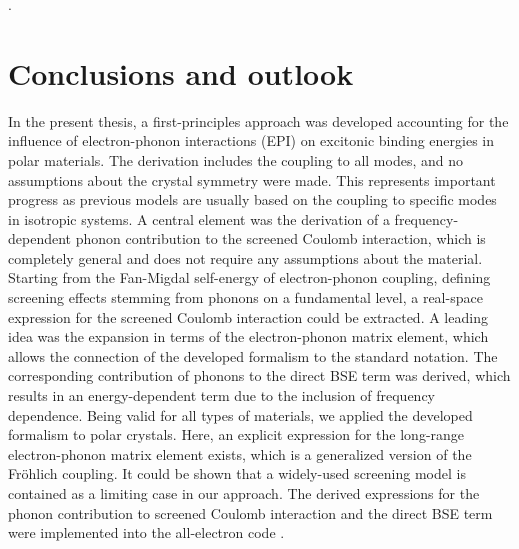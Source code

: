 \vspace{\fill}

\newpage
\phantom.
\vspace{3cm}
\section{Conclusions and outlook}
In the present thesis, a first-principles approach was developed accounting for the influence of electron-phonon interactions (EPI) on excitonic binding energies in polar materials. The derivation includes the coupling to all modes, and no assumptions about the crystal symmetry were made. This represents important progress as previous models are usually based on the coupling to specific modes in isotropic systems. A central element was the derivation of a frequency-dependent phonon contribution to the screened Coulomb interaction, which is completely general and does not require any assumptions about the material. Starting from the Fan-Migdal self-energy of electron-phonon coupling, defining screening effects stemming from phonons on a fundamental level, a real-space expression for the screened Coulomb interaction could be extracted. A leading idea was the expansion in terms of the electron-phonon matrix element, which allows the connection of the developed formalism to the standard notation. The corresponding contribution of phonons to the direct BSE term was derived, which results in an energy-dependent term due to the inclusion of frequency dependence. Being valid for all types of materials, we applied the developed formalism to polar crystals. Here, an explicit expression for the long-range electron-phonon matrix element exists, which is a generalized version of the Fr\"ohlich coupling.  It could be shown that a widely-used screening model is contained as a limiting case in our approach.  The derived expressions for the phonon contribution to screened Coulomb interaction and the direct BSE term were implemented into the all-electron code \exciting{}. \par
